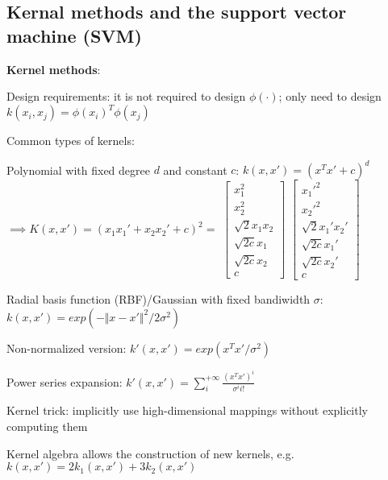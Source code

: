 \documentclass[letterpaper,fontsize=5pt]{scrartcl}
\renewenvironment{enumerate}[1]{\begin{compactenum}#1}{\end{compactenum}}
\theoremstyle{definition}
\begin{document}
\begin{multicols}{2}
\section{Kernal methods and the support vector machine (SVM)}
	\begin{enumerate}
		\item \textbf{Kernel methods}:
			\begin{enumerate}
				\item Design requirements: it is not required to design $\phi(\cdot)$; only need to design $k(x_i,x_j) = \phi(x_i)^T \phi(x_j)$
				\item Common types of kernels:
					\begin{enumerate}
						\item Polynomial with fixed degree $d$ and constant $c$: $k(x,x') = (x^T x' + c)^d$ \\
						$ \implies K(x,x') = (x_1 x_1' + x_2 x_2' + c)^2 = $ $\begin{bmatrix} x_1^2 \\ x_2^2 \\ \sqrt{2} x_1 x_2 \\ \sqrt{2c} x_1 \\ \sqrt{2c} x_2 \\ c \end{bmatrix}$ $\begin{bmatrix} x_1'^2 \\ x_2'^2 \\ \sqrt{2} x_1' x_2' \\ \sqrt{2c} x_1' \\ \sqrt{2c} x_2' \\ c \end{bmatrix}$
						\item Radial basis function (RBF)/Gaussian with fixed bandiwidth $\sigma$: $k(x,x') = exp(-\Vert x-x' \Vert ^2 / 2 \sigma^2)$
							\begin{enumerate}
								\item Non-normalized version: $k'(x,x') = exp(x^T x' / \sigma^2)$
								\item Power series expansion: $k'(x,x') = \sum\limits_i^{+\infty} \frac{(x^T x')^i}{\sigma^i i !}$
							\end{enumerate}
					\end{enumerate}
				\item Kernel trick: implicitly use high-dimensional mappings without explicitly computing them
				\item Kernel algebra allows the construction of new kernels, e.g. $k(x,x') = 2 k_1(x,x') + 3 k_2(x,x')$

\end{enumerate}
\end{enumerate}
\end{multicols}
\end{document}
